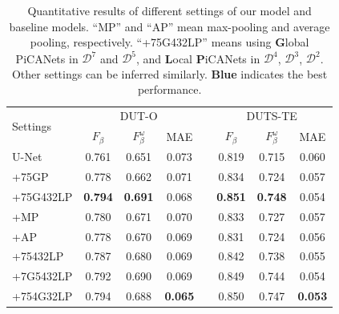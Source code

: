 \documentclass[10pt,twocolumn,letterpaper]{article}
\def\blu#1{\textbf{\color{blue} #1}} %
\begin{document}
\begin{table} [!t]
\begin{center}
\caption{Quantitative results of different settings of our model and baseline models. ``MP'' and ``AP'' mean max-pooling and average pooling, respectively. ``+75G432LP'' means using \textbf{G}lobal PiCANets in $\mathcal D^7$ and $\mathcal D^5$, and \textbf{L}ocal \textbf{P}iCANets in $\mathcal D^4$, $\mathcal D^3$, $\mathcal D^2$. Other settings can be inferred similarly. \blu{Blue} indicates the best performance.}
\vspace{1mm}
\label{ablationTab}
\footnotesize
\begin{tabular}{@{}lccccccc@{}}
\toprule
\multirow{2}{*}{Settings} & \multicolumn{3}{c}{DUT-O \cite{yang2013gbmr}}  && \multicolumn{3}{c}{DUTS-TE \cite{wang2017duts}} \\
\cmidrule{2-4} \cmidrule{6-8}
                          &  $F_{\beta}$   &  $F_{\beta}^{\omega}$  &   MAE    && $F_{\beta}$   &  $F_{\beta}^{\omega}$  &   MAE  \\ \midrule
U-Net \cite{ronneberger2015unet} & 0.761   & 0.651                  & 0.073    && 0.819         & 0.715                  & 0.060  \\ \midrule
+75GP                     & 0.778          & 0.662                  & 0.071    && 0.834         & 0.724                  & 0.057  \\
+75G432LP                 &\blu{0.794}     &\blu{0.691}             & 0.068    &&\blu{0.851}    &\blu{0.748}             & 0.054  \\ \midrule
+MP                       & 0.780          & 0.671                  & 0.070    && 0.833         & 0.727                  & 0.057  \\
+AP                       & 0.778          & 0.670                  & 0.069    && 0.831         & 0.724                  & 0.056  \\ \midrule
+75432LP                  & 0.787          & 0.680                  & 0.069    && 0.842         & 0.738                  & 0.055  \\
+7G5432LP                 & 0.792          & 0.690                  & 0.069    && 0.849         & 0.744                  & 0.054  \\
+754G32LP                 & 0.794          & 0.688                  &\blu{0.065} && 0.850         & 0.747                &\blu{0.053}  \\
\bottomrule
\end{tabular}
\vspace{-0.7cm}
\end{center}{}
\end{table}
\end{document}
